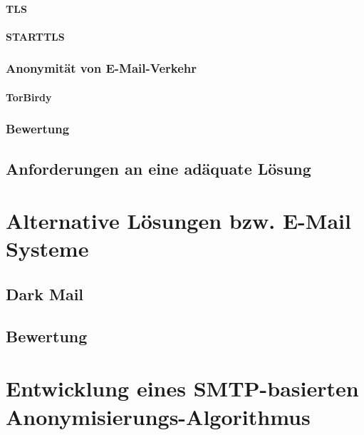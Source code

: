 \documentclass[	%
				a4paper, %
				onecolumn, %
				oneside, %
				titlepage, %
				openany, %
				12pt] %
				{report}
\begin{document}
			\subsubsection{TLS}
				
			\subsubsection{STARTTLS}
				
		\subsection{Anonymität von E-Mail-Verkehr}
			
			\subsubsection{TorBirdy}
					
		\subsection{Bewertung}
			
	\section{Anforderungen an eine adäquate Lösung}
		
	
\chapter{Alternative Lösungen bzw. E-Mail Systeme}
	
	\section{Dark Mail}
		
	\section{Bewertung}
		
		
\chapter{Entwicklung eines SMTP-basierten Anonymisierungs-Algorithmus}
	
\end{document}
